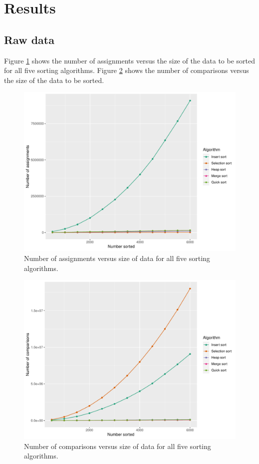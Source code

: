 \documentclass[10pt,fleqn]{article}
\begin{document}
\section{Results}

\subsection{Raw data}

Figure \ref{fig:assignment-plot} shows the number of assignments versus the size of the data to be sorted for all five sorting algorithms. Figure \ref{fig:comp-plot} shows the number of comparisons versus the size of the data to be sorted.

\begin{figure}[h]
\centering\includegraphics[scale=0.4]{CoSc 320 Sort Paper Template/assignment-plot.pdf}
\caption{Number of assignments versus size of data for all five sorting algorithms.}
\label{fig:assignment-plot}
\end{figure}

\begin{figure}[h]
\centering\includegraphics[scale=0.4]{CoSc 320 Sort Paper Template/comp-data-plot.pdf}
\caption{Number of comparisons versus size of data for all five sorting algorithms.}
\label{fig:comp-plot}
\end{figure}
\end{document}
